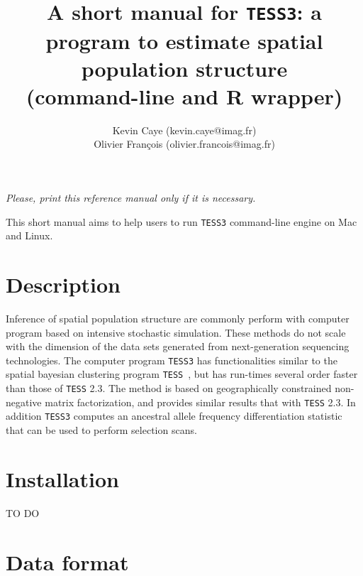 \documentclass[10pt,a4paper]{article}
\title{\bf \Large A short manual for {\tt TESS3}:
a program to estimate spatial population structure\\
\large (command-line and R wrapper)
}
\author{
        Kevin Caye (kevin.caye@imag.fr)\\
        Olivier François (olivier.francois@imag.fr)\\
}
\begin{document}
\maketitle
\begin{center}
{\it Please, print this reference manual only if it is necessary.}
\end{center}

\noindent
This short manual aims to help users to run {\tt TESS3} command-line engine on Mac and Linux. 

\section{Description} 

Inference of spatial population structure are commonly perform with computer program based on intensive stochastic simulation. These methods do not scale with the dimension of the data sets generated from next-generation sequencing technologies. The computer program {\tt TESS3} has functionalities similar to the spatial bayesian clustering program  {\tt TESS}~\cite{durand2009spatial}, but has run-times several order faster than those of {\tt TESS} 2.3. The method is based on geographically constrained non-negative matrix factorization, and provides similar results that with {\tt TESS} 2.3. In addition {\tt TESS3} computes an ancestral allele frequency differentiation statistic that can be used to perform selection scans.

\section{Installation} 

\noindent
TO DO 

\section{Data format}
\end{document}
